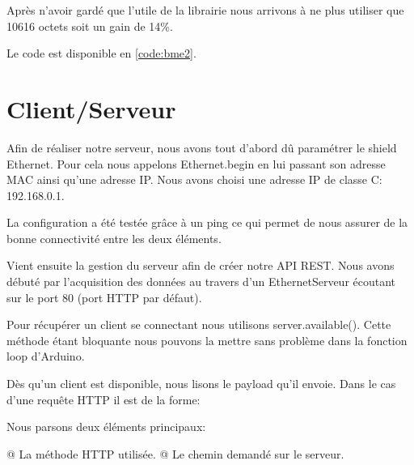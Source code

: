 \documentclass{report}
\begin{document}
  		Après n'avoir gardé que l'utile de la librairie nous arrivons à ne plus utiliser que 10616 octets soit un gain de 14\%.
  		
  		Le code est disponible en \autoref{code:bme2}.
  		
  		\begin{figure}[H]
  			\begin{minipage}{0.49\textwidth}
  			\end{minipage}	
  			\begin{minipage}{0.49\textwidth}
  			\end{minipage}	
  		\end{figure}
  		
  	\chapter{Client/Serveur}
  		Afin de réaliser notre serveur, nous avons tout d'abord dû paramétrer le shield Ethernet.
  		Pour cela nous appelons Ethernet.begin en lui passant son adresse MAC ainsi qu'une adresse IP.
  		Nous avons choisi une adresse IP de classe C: 192.168.0.1.
  		
  		La configuration a été testée grâce à un ping ce qui permet de nous assurer de la bonne connectivité entre les deux éléments.
  		
  		
  		Vient ensuite la gestion du serveur afin de créer notre API REST.
  		Nous avons débuté par l'acquisition des données au travers d'un EthernetServeur écoutant sur le port 80 (port HTTP par défaut).
  		
  		Pour récupérer un client se connectant nous utilisons server.available().
  		Cette méthode étant bloquante nous pouvons la mettre sans problème dans la fonction loop d'Arduino.
  		
  		Dès qu'un client est disponible, nous lisons le payload qu'il envoie.
  		Dans le cas d'une requête HTTP il est de la forme:
  		
  		
  		Nous parsons deux éléments principaux:
  		\begin{easylist}
  			@ La méthode HTTP utilisée.
  			@ Le chemin demandé sur le serveur.
  		\end{easylist}
\end{document}

